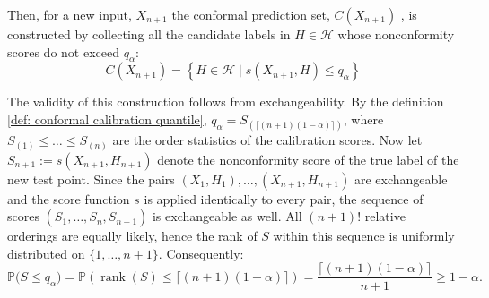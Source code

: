 Then, for a new input, $X_{n+1}$ the conformal prediction set, $C(X_{n+1})$ , is constructed by collecting all 
the candidate labels in $H \in \mathcal{H}$ whose nonconformity scores do not exceed $q_{\alpha}$:
\begin{equation}
\label{eq:prediction_set_definition}
C(X_{n+1}) = \left\{ H \in \mathcal{H} \;\Big|\; s(X_{n+1}, H) \le q_{\alpha} \right\}
\end{equation}


The validity of this construction follows from exchangeability. By the definition \ref{def: conformal calibration quantile}, 
$q_{\alpha} = S_{(\lceil(n+1)(1-\alpha)\rceil)}$, where $S_{(1)} \leq \dots \leq S_{(n)}$ are the order statistics of 
the calibration scores. Now let $S_{n+1} := s(X_{n+1}, H_{n+1})$ denote the nonconformity score of the true label of 
the new test point. Since the pairs $(X_1, H_1), \dots, (X_{n+1}, H_{n+1})$ are exchangeable and the score function $s$ 
is applied identically to every pair, the sequence of scores $(S_1, \dots, S_n, S_{n+1})$ is exchangeable as well. All 
$(n+1)!$ relative orderings are equally likely, hence the rank of $S$ within this sequence is uniformly distributed 
on $\{1, \dots, n+1\}$. Consequently:
$$\mathbb{P}\bigl(S \leq q_{\alpha}\bigr) 
= \mathbb{P}\!\left(\operatorname{rank}(S) \leq \lceil(n+1)(1-\alpha)\rceil\right) 
= \frac{\lceil(n+1)(1-\alpha)\rceil}{n+1} \geq 1-\alpha.$$



